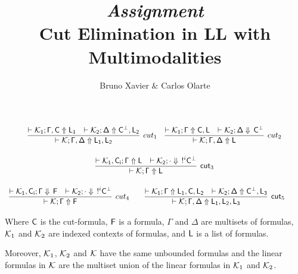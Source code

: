 \documentclass[12pt]{article}
\begin{document}
 
\title{\textit{Assignment}\\
    {\large \textbf{Cut Elimination in LL with Multimodalities}}}%
\author{Bruno Xavier \& Carlos Olarte}
 
\maketitle
 
  	\begin{center}
 		$
 		\begin{array}{ccc ccc}
 			
 			\infer[cut_1]{\unfoc{\Kcal}{\Gamma,\Delta}{L_1,L_2}}{
 				\deduce{\unfoc{\Kcal_1}{\Gamma,\cutF}{L_1}}{}
 				&
 				\deduce{\unfoc{\Kcal_2}{\Delta}{\cutF^\perp,L_2}}{}
 			}
 			\quad
 			\infer[cut_2]{\unfoc{\Kcal}{\Gamma,\Delta}{L}}{
 				\deduce{\unfoc{\Kcal_1}{\Gamma}{\cutF,L}}{}
 				&
 				\deduce{\foc{\Kcal_2}{\Delta}{\cutF^\perp}}{}
 			}
 			\\\\
 			\infer[\cut_3]{\unfoc{\Kcal}{\Gamma}{L}}{
 				\deduce{\unfoc{\Kcal_1,\cutF_i}{\Gamma}{L}}{}
 				&
 				\deduce{\foc{\Kcal_2}{\cdot}{\nbang{i}\cutF^\perp}}{}
 			}
 			\\\\
 			\infer[cut_4]{\unfoc{\Kcal}{\Gamma}{F}}{
 				\deduce{\foc{\Kcal_1,\cutF_i}{\Gamma}{F}}{}
 				&
 				\deduce{\foc{\Kcal_2}{\cdot}{\nbang{i} \cutF^\perp}}{}
 			}
 			\qquad
 			\infer[\cut_5]{\unfoc{\Kcal}{\Gamma,\Delta}{L_1,L_2,L_3}}{
 				\deduce{\unfoc{\Kcal_1}{\Gamma}{L_1,\cutF,L_2}}{}
 				&
 				\deduce{\unfoc{\Kcal_2}{\Delta}{\cutF^\perp,L_3}}{}
 			}
 			\qquad
 		\end{array}$
 		
 	\end{center}		
 	
 	Where $\mathsf{C}$ is the cut-formula, $\mathsf{F}$ is a formula, $\Gamma$ and $\Delta$ are multisets of formulas, $\mathcal{K}_1$ and $\mathcal{K}_2$ are indexed contexts of formulas, and $\mathsf{L}$ is a list of formulas. 
 
    Moreover, $\mathcal{K}_1$, $\mathcal{K}_2$ and $\mathcal{K}$ have the same unbounded formulas and the linear formulas in $\mathcal{K}$ are the multiset union of the linear formulas in $\mathcal{K}_1$ and $\mathcal{K}_2$.  
    
\newpage
\end{document}
